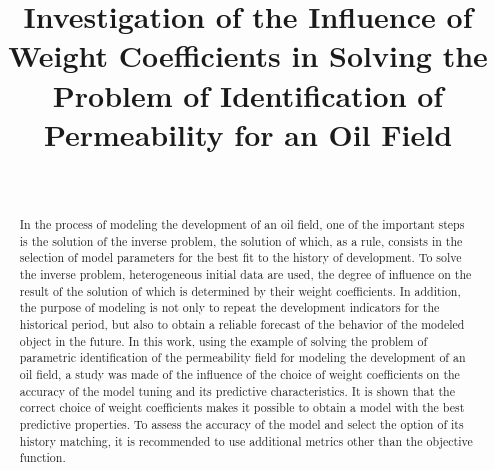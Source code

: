 \documentclass[
11pt,%
tightenlines,%
twoside,%
onecolumn,%
nofloats,%
nobibnotes,%
nofootinbib,%
superscriptaddress,%
noshowpacs,%
centertags]%
{revtex4}
\begin{document}

\title{Investigation of the Influence of Weight Coefficients in Solving the Problem of Identification of Permeability for an Oil Field}

\author{~}







\begin{abstract} %
In the process of modeling the development of an oil field, one of the important steps is the solution of the inverse problem, the solution of which, as a rule, consists in the selection of model parameters for the best fit to the history of development. To solve the inverse problem, heterogeneous initial data are used, the degree of influence on the result of the solution of which is determined by their weight coefficients. In addition, the purpose of modeling is not only to repeat the development indicators for the historical period, but also to obtain a reliable forecast of the behavior of the modeled object in the future.
	In this work, using the example of solving the problem of parametric identification of the permeability field for modeling the development of an oil field, a study was made of the influence of the choice of weight coefficients on the accuracy of the model tuning and its predictive characteristics. It is shown that the correct choice of weight coefficients makes it possible to obtain a model with the best predictive properties. To assess the accuracy of the model and select the option of its history matching, it is recommended to use additional metrics other than the objective function.
\end{abstract}
\end{document}
